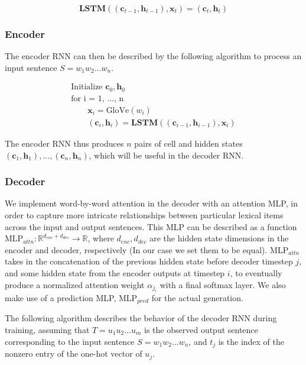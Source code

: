 \documentclass[a4paper, 12pt]{article}
\theoremstyle{definition}
\begin{document}
\[\textbf{LSTM}((\mathbf{c}_{t-1}, \mathbf{h}_{t-1}), \mathbf{x}_{t}) = (\mathbf{c}_{t}, \mathbf{h}_{t})\]

\subsubsection{Encoder}

The encoder RNN can then be described by the following algorithm to process an input sentence $S = w_1w_2...w_n$.

\begin{gather}
\text{Initialize } \mathbf{c}_0, \mathbf{h}_0 \\
\text{for i = 1, ..., n } \\
	\qquad \mathbf{x}_i = \text{GloVe}(w_i)  \\
	\qquad (\mathbf{c}_{i}, \mathbf{h}_{i}) = \textbf{LSTM}((\mathbf{c}_{i-1}, \mathbf{h}_{i-1}), \mathbf{x}_{i}) 
\end{gather}

The encoder RNN thus produces $n$ pairs of cell and hidden states $(\mathbf{c}_1, \mathbf{h}_1), ..., (\mathbf{c}_n, \mathbf{h}_n)$, which will be useful in the decoder RNN. 

\subsubsection{Decoder}

We implement word-by-word attention in the decoder with an attention MLP, in order to capture more intricate relationships between particular lexical items across the input and output sentences. This MLP can be described as a function $\text{MLP}_{attn} : \mathbb{R}^{d_{enc} + d_{dec}} \to \mathbb{R}$, where $d_{enc}, d_{dec}$ are the hidden state dimensions in the encoder and decoder, respectively (In our case we set them to be equal). $\text{MLP}_{attn}$ takes in the concatenation of the previous hidden state before decoder timestep $j$, and some hidden state from the encoder outputs at timestep $i$, to eventually produce a normalized attention weight $\alpha_{j_{i}}$ with a final softmax layer. We also make use of a prediction MLP, $\text{MLP}_{pred}$ for the actual generation.

\bigskip

 The following algorithm describes the behavior of the decoder RNN during training, assuming that $T = u_1u_2...u_m$ is the observed output sentence corresponding to the input sentence $S = w_1w_2...w_n$, and $t_j$ is the index of the nonzero entry of the one-hot vector of $u_j$.
\end{document}
